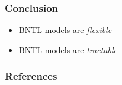 \documentclass[final,hyperref={pdfpagelabels=false},noamsthm]{beamer}
\def\Geom{\text{Geom}}
\newcommand{\PYP}{\mathcal{PYP}}
\newcommand{\geom}{\beta}
\begin{document}

\begin{frame}
	\frametitle{Conclusion}
	\begin{itemize}
		\item BNTL models are \textit{flexible}
		\item BNTL models are \textit{tractable}
	\end{itemize}
\end{frame}

\begin{frame}
	\frametitle{References}
	\tiny{
	}
\end{frame}
\end{document}
